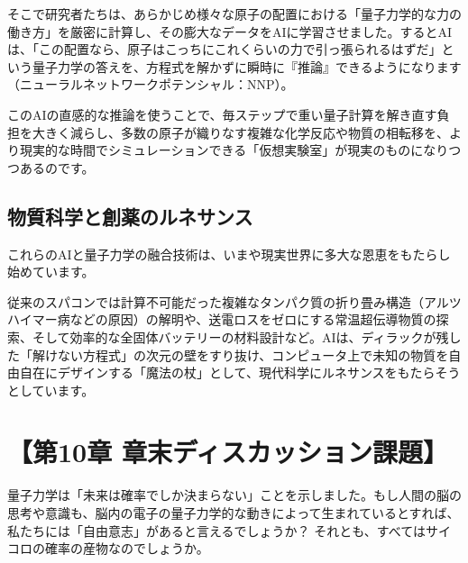 そこで研究者たちは、あらかじめ様々な原子の配置における「量子力学的な力の働き方」を厳密に計算し、その膨大なデータをAIに学習させました。するとAIは、「この配置なら、原子はこっちにこれくらいの力で引っ張られるはずだ」という量子力学の答えを、方程式を解かずに瞬時に『推論』できるようになります（ニューラルネットワークポテンシャル：NNP）。

このAIの直感的な推論を使うことで、毎ステップで重い量子計算を解き直す負担を大きく減らし、多数の原子が織りなす複雑な化学反応や物質の相転移を、より現実的な時間でシミュレーションできる「仮想実験室」が現実のものになりつつあるのです。

\subsection{物質科学と創薬のルネサンス}

これらのAIと量子力学の融合技術は、いまや現実世界に多大な恩恵をもたらし始めています。

従来のスパコンでは計算不可能だった複雑なタンパク質の折り畳み構造（アルツハイマー病などの原因）の解明や、送電ロスをゼロにする常温超伝導物質の探索、そして効率的な全固体バッテリーの材料設計など。AIは、ディラックが残した「解けない方程式」の次元の壁をすり抜け、コンピュータ上で未知の物質を自由自在にデザインする「魔法の杖」として、現代科学にルネサンスをもたらそうとしています。

\section*{【第10章 章末ディスカッション課題】}

量子力学は「未来は確率でしか決まらない」ことを示しました。もし人間の脳の思考や意識も、脳内の電子の量子力学的な動きによって生まれているとすれば、私たちには「自由意志」があると言えるでしょうか？ それとも、すべてはサイコロの確率の産物なのでしょうか。




